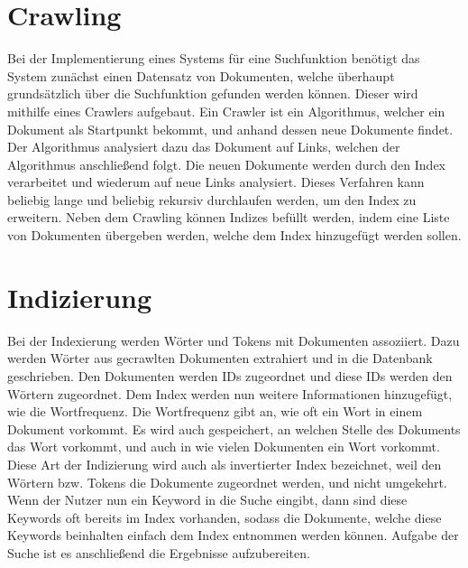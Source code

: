 \section{Crawling}
Bei der Implementierung eines Systems für eine Suchfunktion benötigt das System zunächst einen Datensatz von Dokumenten, welche überhaupt grundsätzlich über die Suchfunktion gefunden werden können.
Dieser wird mithilfe eines Crawlers aufgebaut.
Ein Crawler ist ein Algorithmus, welcher ein Dokument als Startpunkt bekommt, und anhand dessen neue Dokumente findet.
Der Algorithmus analysiert dazu das Dokument auf Links, welchen der Algorithmus anschließend folgt.
Die neuen Dokumente werden durch den Index verarbeitet und wiederum auf neue Links analysiert.
Dieses Verfahren kann beliebig lange und beliebig rekursiv durchlaufen werden, um den Index zu erweitern.
Neben dem Crawling können Indizes befüllt werden, indem eine Liste von Dokumenten übergeben werden, welche dem Index hinzugefügt werden sollen.

\section{Indizierung}
Bei der Indexierung werden Wörter und Tokens mit Dokumenten assoziiert.
Dazu werden Wörter aus gecrawlten Dokumenten extrahiert und in die Datenbank geschrieben.
Den Dokumenten werden IDs zugeordnet und diese IDs werden den Wörtern zugeordnet.
Dem Index werden nun weitere Informationen hinzugefügt, wie die Wortfrequenz.
Die Wortfrequenz gibt an, wie oft ein Wort in einem Dokument vorkommt.
Es wird auch gespeichert, an welchen Stelle des Dokuments das Wort vorkommt, und auch in wie vielen Dokumenten ein Wort vorkommt.
Diese Art der Indizierung wird auch als invertierter Index bezeichnet, weil den Wörtern bzw.
Tokens die Dokumente zugeordnet werden, und nicht umgekehrt.
Wenn der Nutzer nun ein Keyword in die Suche eingibt, dann sind diese Keywords oft bereits im Index vorhanden, sodass die Dokumente, welche diese Keywords beinhalten einfach dem Index entnommen werden können.
Aufgabe der Suche ist es anschließend die Ergebnisse aufzubereiten.

